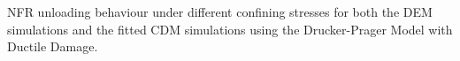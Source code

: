 \label{fig:unload1} NFR unloading behaviour under different confining stresses for both the DEM simulations and the fitted CDM simulations using the Drucker-Prager Model with Ductile Damage.